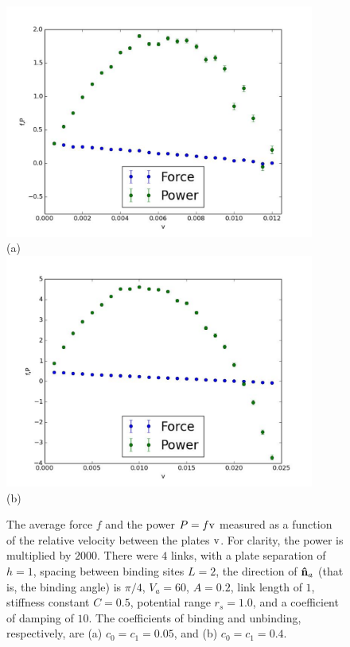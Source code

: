 \documentclass[11pt]{ucthesis}
\def\nhat{{\bf\hat n}}
\begin{document}
\begin{figure}[htp]
\begin{center}
\includegraphics[width=4in]{0505per}\\
(a)\\
\includegraphics[width=4in]{4040per}\\
(b)
\caption{
The average force $f$ and the power $P=f {\rm v}$ measured as a function of the
relative velocity between the plates $\rm v$.  For clarity, the power is multiplied by $2000$. 
There were $4$ links, with a plate
separation of $h=1$, spacing between binding sites $L = 2$, the direction of $\nhat_a$ (that is, the binding angle) is
$\pi/4$, $V_a=60$, $A=0.2$, link length of $1$, stiffness constant $C=0.5$,
potential range $r_s = 1.0$, and a coefficient of damping of $10$. The coefficients of binding and unbinding, respectively, are (a) $c_0 = c_1 = 0.05$, and (b) $c_0 = c_1 = 0.4$.
}
\label{fig:expVper}
\end{center}
\end{figure}
\end{document}
